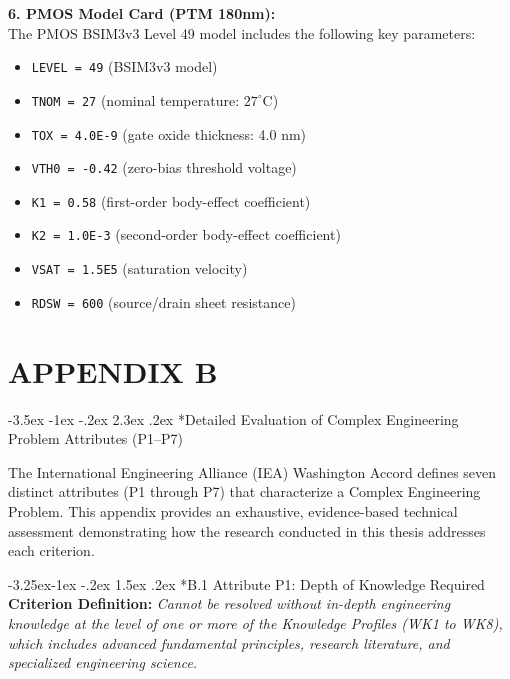 \documentclass[12pt,a4paper,oneside]{report}
\makeatletter
\renewcommand\section{\@startsection {section}{1}{\z@}%
                                   {-3.5ex \@plus -1ex \@minus -.2ex}%
                                   {2.3ex \@plus.2ex}%
                                   {\normalfont\normalsize\bfseries}}
\renewcommand\subsection{\@startsection{subsection}{2}{\z@}%
                                     {-3.25ex\@plus -1ex \@minus -.2ex}%
                                     {1.5ex \@plus .2ex}%
                                     {\normalfont\normalsize\bfseries\itshape}}
\makeatother
\begin{document}
\vspace{0.3cm}
\noindent\textbf{6. PMOS Model Card (PTM 180nm):}\\
The PMOS BSIM3v3 Level 49 model includes the following key parameters:
\begin{itemize}
\item \texttt{LEVEL = 49} (BSIM3v3 model)
\item \texttt{TNOM = 27} (nominal temperature: $27^\circ\text{C}$)
\item \texttt{TOX = 4.0E-9} (gate oxide thickness: 4.0 nm)
\item \texttt{VTH0 = -0.42} (zero-bias threshold voltage)
\item \texttt{K1 = 0.58} (first-order body-effect coefficient)
\item \texttt{K2 = 1.0E-3} (second-order body-effect coefficient)
\item \texttt{VSAT = 1.5E5} (saturation velocity)
\item \texttt{RDSW = 600} (source/drain sheet resistance)
\end{itemize}


\clearpage
\chapter*{APPENDIX B}

\section*{Detailed Evaluation of Complex Engineering Problem Attributes (P1--P7)}

The International Engineering Alliance (IEA) Washington Accord defines seven distinct attributes (P1 through P7) that characterize a Complex Engineering Problem. This appendix provides an exhaustive, evidence-based technical assessment demonstrating how the research conducted in this thesis addresses each criterion.

\subsection*{B.1 Attribute P1: Depth of Knowledge Required}
\textbf{Criterion Definition:} \textit{Cannot be resolved without in-depth engineering knowledge at the level of one or more of the Knowledge Profiles (WK1 to WK8), which includes advanced fundamental principles, research literature, and specialized engineering science.}
\end{document}
